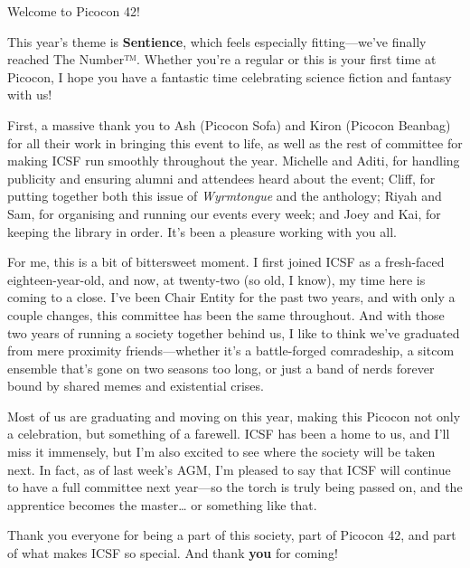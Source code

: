 Welcome to Picocon 42!

This year’s theme is \textbf{Sentience}, which feels especially fitting—we’ve finally reached The Number™. Whether you’re a regular or this is your first time at Picocon, I hope you have a fantastic time celebrating science fiction and fantasy with us!

First, a massive thank you to Ash (Picocon Sofa) and Kiron (Picocon Beanbag) for all their work in bringing this event to life, as well as the rest of committee for making ICSF run smoothly throughout the year. Michelle and Aditi, for handling publicity and ensuring alumni and attendees heard about the event; Cliff, for putting together both this issue of \textit{Wyrmtongue} and the anthology; Riyah and Sam, for organising and running our events every week; and Joey and Kai, for keeping the library in order. It’s been a pleasure working with you all.

For me, this is a bit of bittersweet moment. I first joined ICSF as a fresh-faced eighteen-year-old, and now, at twenty-two (so old, I know), my time here is coming to a close. I’ve been Chair Entity for the past two years, and with only a couple changes, this committee has been the same throughout. And with those two years of running a society together behind us, I like to think we’ve graduated from mere proximity friends—whether it’s a battle-forged comradeship, a sitcom ensemble that’s gone on two seasons too long, or just a band of nerds forever bound by shared memes and existential crises.

Most of us are graduating and moving on this year, making this Picocon not only a celebration, but something of a farewell. ICSF has been a home to us, and I’ll miss it immensely, but I’m also excited to see where the society will be taken next. In fact, as of last week’s AGM, I’m pleased to say that ICSF will continue to have a full committee next year—so the torch is truly being passed on, and the apprentice becomes the master… or something like that.

Thank you everyone for being a part of this society, part of Picocon 42, and part of what makes ICSF so special. And thank \textbf{you} for coming!
